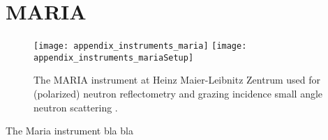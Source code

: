 \documentclass[\main/dresen_thesis.tex]{subfiles}
\begin{document}
\section{MARIA}\label{ch:appendix:lss:maria}
\begin{figure}[h]
  \centering
  \texttt{[image: appendix\_instruments\_maria]}
  \texttt{[image: appendix\_instruments\_mariaSetup]}
  \caption{\label{fig:appendix:lss:maria}The MARIA instrument at Heinz Maier-Leibnitz Zentrum used for (polarized) neutron reflectometry and grazing incidence small angle neutron scattering \cite{Heinz_2015_Maria}.}
\end{figure}
The Maria instrument bla bla
\end{document}
